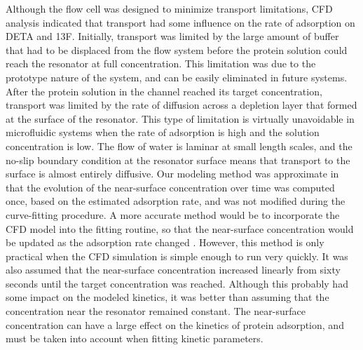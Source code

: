 Although the flow cell was designed to minimize transport limitations,
CFD analysis indicated that transport had some influence on the rate
of adsorption on DETA and 13F. Initially, transport was limited by
the large amount of buffer that had to be displaced from the flow
system before the protein solution could reach the resonator at full
concentration. This limitation was due to the prototype nature of
the system, and can be easily eliminated in future systems. After
the protein solution in the channel reached its target concentration,
transport was limited by the rate of diffusion across a depletion
layer that formed at the surface of the resonator. This type of limitation
is virtually unavoidable in microfluidic systems when the rate of
adsorption is high and the solution concentration is low. The flow
of water is laminar at small length scales, and the no-slip boundary
condition at the resonator surface means that transport to the surface
is almost entirely diffusive. Our modeling method was approximate
in that the evolution of the near-surface concentration over time
was computed once, based on the estimated adsorption rate, and was
not modified during the curve-fitting procedure. A more accurate method
would be to incorporate the CFD model into the fitting routine, so
that the near-surface concentration would be updated as the adsorption
rate changed \cite{Jenkins2004}. However, this method is only practical
when the CFD simulation is simple enough to run very quickly. It was
also assumed that the near-surface concentration increased linearly
from sixty seconds until the target concentration was reached. Although
this probably had some impact on the modeled kinetics, it was better
than assuming that the concentration near the resonator remained constant.
The near-surface concentration can have a large effect on the kinetics
of protein adsorption, and must be taken into account when fitting
kinetic parameters.

